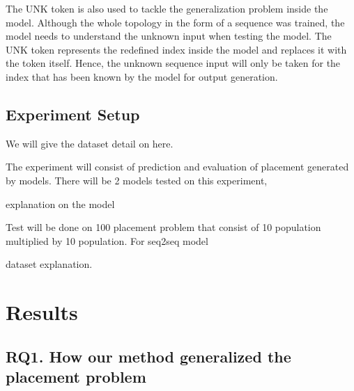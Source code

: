 \documentclass[conference]{IEEEtran}
\begin{document}
The UNK token is also used to tackle the generalization problem inside the model. Although the whole topology in the form of a sequence was trained, the model needs to understand the unknown input when testing the model. The UNK token represents the redefined index inside the model and replaces it with the token itself. Hence, the unknown sequence input will only be taken for the index that has been known by the model for output generation.



\subsection{Experiment Setup}

We will give the dataset detail on here. 

The experiment will consist of prediction and evaluation of placement generated by models. There will be 2 models tested on this experiment, 

explanation on the model

Test will be done on 100 placement problem that consist of 10 population multiplied by 10 population. For seq2seq model 

dataset explanation. 







\section{Results}

\subsection*{RQ1. How our method generalized the placement problem}








\end{document}
